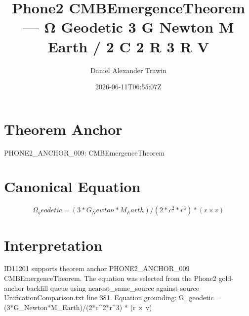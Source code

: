 \documentclass[11pt]{article}
\title{Phone2 CMBEmergenceTheorem — Ω Geodetic 3 G Newton M Earth / 2 C 2 R 3 R V}
\author{Daniel Alexander Trawin}
\date{2026-06-11T06:55:07Z}
\begin{document}
\maketitle
\section*{Theorem Anchor}
PHONE2_ANCHOR_009: CMBEmergenceTheorem
\section*{Canonical Equation}
\[
Ω_geodetic = (3*G_Newton*M_Earth)/(2*c^2*r^3) * (r × v)
\]
\section*{Interpretation}
ID11201 supports theorem anchor PHONE2_ANCHOR_009 CMBEmergenceTheorem. The equation was selected from the Phone2 gold-anchor backfill queue using nearest_same_source against source UnificationComparison.txt line 381. Equation grounding: Ω_geodetic = (3*G_Newton*M_Earth)/(2*c^2*r^3) * (r × v)
\end{document}
